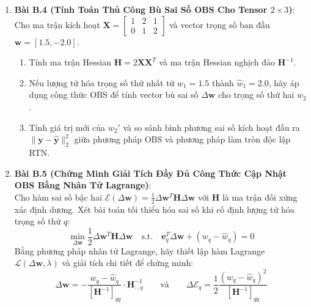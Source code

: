 \begin{enumerate}
  \item \textbf{Bài B.4 (Tính Toán Thủ Công Bù Sai Số OBS Cho Tensor $2 \times 3$)}: \\
  Cho ma trận kích hoạt $\mathbf{X} = \begin{bmatrix} 1 & 2 & 1 \\ 0 & 1 & 2 \end{bmatrix}$ và vector trọng số ban đầu $\mathbf{w} = [1.5, -2.0]$.
  \begin{enumerate}
    \item Tính ma trận Hessian $\mathbf{H} = 2 \mathbf{X} \mathbf{X}^T$ và ma trận Hessian nghịch đảo $\mathbf{H}^{-1}$.
    \item Nếu lượng tử hóa trọng số thứ nhất từ $w_1 = 1.5$ thành $\hat{w}_1 = 2.0$, hãy áp dụng công thức OBS để tính vector bù sai số $\Delta \mathbf{w}$ cho trọng số thứ hai $w_2$.
    \item Tính giá trị mới của $w_2'$ và so sánh bình phương sai số kích hoạt đầu ra $\|\mathbf{y} - \hat{\mathbf{y}}\|_2^2$ giữa phương pháp OBS và phương pháp làm tròn độc lập RTN.
  \end{enumerate}

  \item \textbf{Bài B.5 (Chứng Minh Giải Tích Đầy Đủ Công Thức Cập Nhật OBS Bằng Nhân Tử Lagrange)}: \\
  Cho hàm sai số bậc hai $\mathcal{E}(\Delta \mathbf{w}) = \frac{1}{2} \Delta \mathbf{w}^T \mathbf{H} \Delta \mathbf{w}$ với $\mathbf{H}$ là ma trận đối xứng xác định dương. Xét bài toán tối thiểu hóa sai số khi cố định lượng tử hóa trọng số thứ $q$:
  \begin{equation*}
  \min_{\Delta \mathbf{w}} \frac{1}{2} \Delta \mathbf{w}^T \mathbf{H} \Delta \mathbf{w} \quad \text{s.t.} \quad \mathbf{e}_q^T \Delta \mathbf{w} + (w_q - \hat{w}_q) = 0
  \end{equation*}
  Bằng phương pháp nhân tử Lagrange, hãy thiết lập hàm Lagrange $\mathcal{L}(\Delta \mathbf{w}, \lambda)$ và giải tích chi tiết để chứng minh:
  \begin{equation*}
  \Delta \mathbf{w} = - \frac{w_q - \hat{w}_q}{[\mathbf{H}^{-1}]_{qq}} \cdot \mathbf{H}^{-1}_{:, q} \qquad \text{và} \qquad \Delta \mathcal{E}_q = \frac{1}{2} \frac{(w_q - \hat{w}_q)^2}{[\mathbf{H}^{-1}]_{qq}}
  \end{equation*}


\end{enumerate}
